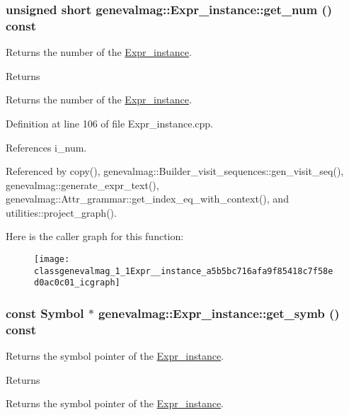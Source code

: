 \hypertarget{classgenevalmag_1_1Expr__instance_a5b5bc716afa9f85418c7f58ed0ac0c01}{
\subsubsection[{get\_\-num}]{\setlength{\rightskip}{0pt plus 5cm}unsigned short genevalmag::Expr\_\-instance::get\_\-num () const}}
\label{classgenevalmag_1_1Expr__instance_a5b5bc716afa9f85418c7f58ed0ac0c01}
Returns the number of the \hyperlink{classgenevalmag_1_1Expr__instance}{Expr\_\-instance}. \begin{DoxyReturn}{Returns}

\end{DoxyReturn}
Returns the number of the \hyperlink{classgenevalmag_1_1Expr__instance}{Expr\_\-instance}. 

Definition at line 106 of file Expr\_\-instance.cpp.



References i\_\-num.



Referenced by copy(), genevalmag::Builder\_\-visit\_\-sequences::gen\_\-visit\_\-seq(), genevalmag::generate\_\-expr\_\-text(), genevalmag::Attr\_\-grammar::get\_\-index\_\-eq\_\-with\_\-context(), and utilities::project\_\-graph().



Here is the caller graph for this function:\nopagebreak
\begin{figure}[H]
\begin{center}
\leavevmode
\texttt{[image: classgenevalmag\_1\_1Expr\_\_instance\_a5b5bc716afa9f85418c7f58ed0ac0c01\_icgraph]}
\end{center}
\end{figure}


\hypertarget{classgenevalmag_1_1Expr__instance_a5327a138bd6dc934ce89d878d973bfb0}{
\subsubsection[{get\_\-symb}]{\setlength{\rightskip}{0pt plus 5cm}const {\bf Symbol} $\ast$ genevalmag::Expr\_\-instance::get\_\-symb () const}}
\label{classgenevalmag_1_1Expr__instance_a5327a138bd6dc934ce89d878d973bfb0}
Returns the symbol pointer of the \hyperlink{classgenevalmag_1_1Expr__instance}{Expr\_\-instance}. \begin{DoxyReturn}{Returns}

\end{DoxyReturn}
Returns the symbol pointer of the \hyperlink{classgenevalmag_1_1Expr__instance}{Expr\_\-instance}. 

